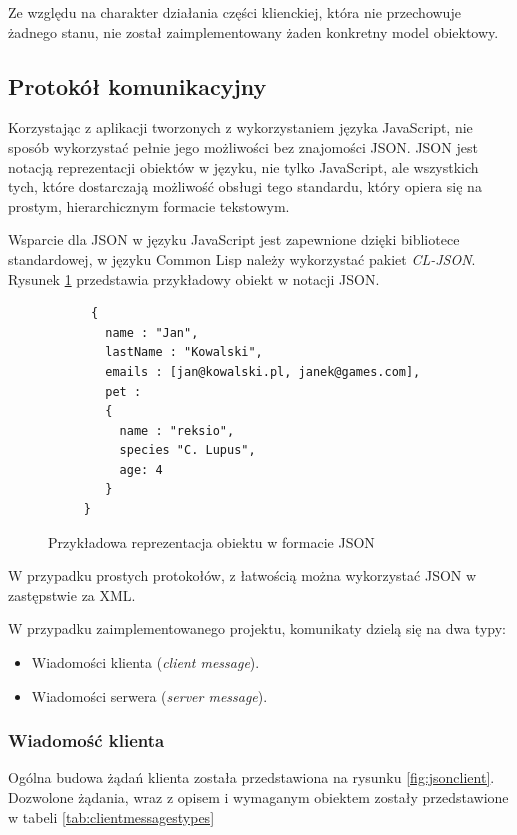 Ze względu na charakter działania części klienckiej, która nie przechowuje żadnego stanu, nie został zaimplementowany żaden konkretny model obiektowy.
\clearpage

\subsection{Protokół komunikacyjny}

Korzystając z aplikacji tworzonych z wykorzystaniem języka JavaScript, nie sposób wykorzystać pełnie jego możliwości bez znajomości JSON. JSON jest notacją reprezentacji obiektów w języku, nie tylko JavaScript, ale wszystkich tych, które dostarczają możliwość obsługi tego standardu, który opiera się na prostym, hierarchicznym formacie tekstowym.

Wsparcie dla JSON w języku JavaScript jest zapewnione dzięki bibliotece standardowej, w języku Common Lisp należy wykorzystać pakiet \emph{CL-JSON}. Rysunek \ref{fig:jsonexample} przedstawia przykładowy obiekt w notacji JSON.
\begin{figure}[ht]
    \centering
    \begin{verbatim}
      {
        name : "Jan",
        lastName : "Kowalski",
        emails : [jan@kowalski.pl, janek@games.com],
        pet :
        {
          name : "reksio",
          species "C. Lupus",
          age: 4
        }
     }
      \end{verbatim}
    \caption{Przykładowa reprezentacja obiektu w formacie JSON}
    \label{fig:jsonexample}
\end{figure}
W przypadku prostych protokołów, z łatwością można wykorzystać JSON w zastępstwie za XML.

W przypadku zaimplementowanego projektu, komunikaty dzielą się na dwa typy:
\begin{itemize}
  \item Wiadomości klienta (\emph{client message}).
  \item Wiadomości serwera (\emph{server message}).
\end{itemize}

\subsubsection{Wiadomość klienta}
Ogólna budowa żądań klienta została przedstawiona na rysunku \ref{fig:jsonclient}.
Dozwolone żądania, wraz z opisem i wymaganym obiektem zostały przedstawione w tabeli \ref{tab:clientmessagestypes}

